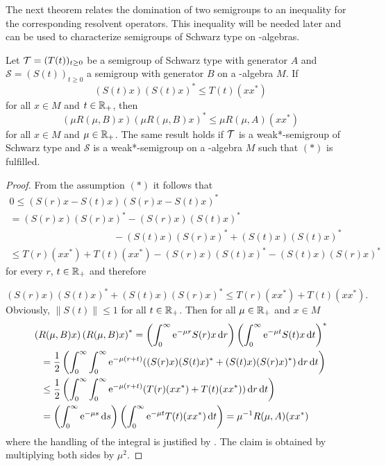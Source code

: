 The next theorem relates the domination of two semigroups to an inequality for the corresponding resolvent operators.
This inequality will be needed later and can be used to characterize semigroups of Schwarz type on \CA-algebras.
\begin{theorem}\label{thm:d1-2.1}
Let $  \TT  = (T(t))_{t\geq0} $ be a semigroup of Schwarz type with generator $ A $ and $ \mathcal{S} = (S(t))_{t\geq0} $ a semigroup with generator $ B $ on a \CA-algebra $ M $.
If
\begin{equation}
	(S(t)x)(S(t)x)^{*} \leq T(t)(xx^{*}) \tag{*}
\end{equation}
for all $ x \in M $ and $ t \in \mathbb{R}_{+} $,
then  
\[
	\left( \mu R(\mu,B)x \right) \left( \mu R(\mu,B)x \right)^{*} \leq \mu R(\mu,A)(xx^{*})
\]
for all $ x \in M $ and $ \mu \in \mathbb{R}_{+} $.
The same result holds if\/ $ \mathcal{T} $ is a weak*-semigroup of Schwarz type and $ \mathcal{S} $ is a weak*-semigroup on a \WA-algebra $ M $ such that $ (*) $ is fulfilled.
\end{theorem}
\begin{proof}
From the assumption $ (*) $ it follows that
\begin{multline*}
	0 	 \leq \left( S(r)x - S(t)x \right) \left( S(r)x - S(t)x \right)^{*} {} \\
		  = (S(r)x)(S(r)x)^{*} - (S(r)x)(S(t)x)^{*} \\
		 \phantom{(S(r)x)(S(r)x)^{*}} - (S(t)x)(S(r)x)^{*} + (S(t)x)(S(t)x)^{*}  \\
		\leq T(r)(xx^{*}) + T(t)(xx^{*})   - (S(r)x)(S(t)x)^{*} -  
		   (S(t)x)(S(r)x)^{*}
\end{multline*}
for every $ r $, $ t \in \mathbb{R}_{+} $ and therefore

\[
	(S(r)x)(S(t)x)^{*} + (S(t)x)(S(r)x)^{*} \leq T(r)(xx^{*}) + T(t)(xx^{*}) .
\]
Obviously, $ \| S(t)\| \leq 1 $ for all $ t \in \mathbb{R}_{+} $.
Then for all $ \mu \in \mathbb{R}_{+} $ and $ x \in M $
\begin{align*}
	 {}& \left( R(\mu,B)x  \right) \left( R(\mu,B)x \right)^{*} 
		= \left( \int_{0}^\infty \eu^{-\mu r}S(r)x \dr \right)
			\left( \int_{0}^\infty \eu^{-\mu t}S(t)x \dt \right)^{*}   \\
	&\phantom{=}= \frac{1}{2} \left( \int_{0}^\infty \int_{0}^\infty \eu^{-\mu(r+t)} ((S(r)x)(S(t)x)^{*}  
			+ (S(t)x)(S(r)x)^{*}) \dr \dt \right) \\
	&\phantom{=}\leq \frac{1}{2} \left(\int_{0}^\infty \int_{0}^\infty \eu^{-\mu(r+t)} (T(r)(xx^{*}) + T(t)(xx^{*}))  			\dr \dt \right)\\
	&\phantom{=}= \left( \int_{0}^\infty \eu^{-\mu s} \ds \right)
			\left( \int_{0}^\infty \eu^{-\mu t}T(t)(xx^{*}) \dt \right) 
				= \mu^{-1}R(\mu,A)(xx^{*})
\end{align*}
where the handling of the integral is justified by \textcite[Chap. V, §8, n° 4, Proposition 9]{bourbaki:1955}.
The claim is obtained by multiplying both sides by $\mu^{2} $. 
\end{proof}
